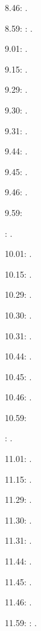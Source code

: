 \documentclass[italian]{article}
\begin{document}
8.46:   .

8.59:   
:  .

9.01:   . 

9.15:   . 

9.29:   . 

9.30:   .

9.31:   .

9.44:   .

9.45:   .

9.46:   .

9.59:   

:  .

10.01:   . 

10.15:   . 

10.29:   . 

10.30:   .

10.31:   .

10.44:   .

10.45:   .

10.46:   .

10.59:   

:  .

11.01:   . 

11.15:   . 

11.29:   . 

11.30:   .

11.31:   .

11.44:   .

11.45:   .

11.46:   .

11.59:   
:   .
\end{document}
